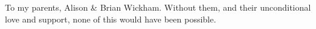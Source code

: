 \frontmatter

\begin{dedication}
To my parents, Alison \& Brian Wickham. Without them, and their unconditional
love and support, none of this would have been possible.
\end{dedication}
